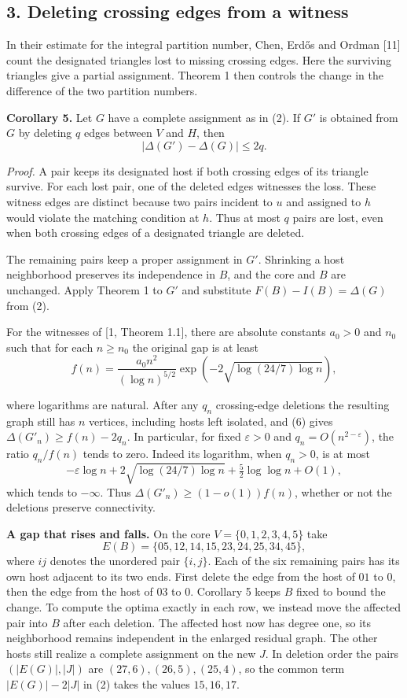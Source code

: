 \documentclass[english,11pt,a4paper]{article}
\begin{document}
\subsection{3. Deleting crossing edges from a witness}\label{deleting-crossing-edges-from-a-witness}

In their estimate for the integral partition number, Chen, Erdős and Ordman {[}11{]} count the designated triangles lost to missing crossing edges. Here the surviving triangles give a partial assignment. Theorem 1 then controls the change in the difference of the two partition numbers.

\textbf{Corollary 5.} Let \(G\) have a complete assignment as in (2). If \(G'\) is obtained from \(G\) by deleting \(q\) edges between \(V\) and \(H\), then
\[
|\Delta(G')-\Delta(G)|\le 2q. \tag{6}
\]

\emph{Proof.} A pair keeps its designated host if both crossing edges of its triangle survive. For each lost pair, one of the deleted edges witnesses the loss. These witness edges are distinct because two pairs incident to \(u\) and assigned to \(h\) would violate the matching condition at \(h\). Thus at most \(q\) pairs are lost, even when both crossing edges of a designated triangle are deleted.

The remaining pairs keep a proper assignment in \(G'\). Shrinking a host neighborhood preserves its independence in \(B\), and the core and \(B\) are unchanged. Apply Theorem 1 to \(G'\) and substitute \(F(B)-I(B)=\Delta(G)\) from (2).

For the witnesses of {[}1, Theorem 1.1{]}, there are absolute constants \(a_0>0\) and \(n_0\) such that for each \(n\ge n_0\) the original gap is at least
\[
f(n)=\frac{a_0 n^2}{(\log n)^{5/2}}
      \exp\!\left(-2\sqrt{\log(24/7)\log n}\right),
\]

where logarithms are natural. After any \(q_n\) crossing-edge deletions the resulting graph still has \(n\) vertices, including hosts left isolated, and (6) gives \(\Delta(G'_n)\ge f(n)-2q_n\). In particular, for fixed \(\varepsilon>0\) and \(q_n=O(n^{2-\varepsilon})\), the ratio \(q_n/f(n)\) tends to zero. Indeed its logarithm, when \(q_n>0\), is at most \[
-\varepsilon\log n+2\sqrt{\log(24/7)\log n}+\tfrac52\log\log n+O(1),
\] which tends to \(-\infty\). Thus \(\Delta(G'_n)\ge(1-o(1))f(n)\), whether or not the deletions preserve connectivity.

\textbf{A gap that rises and falls.} On the core \(V=\{0,1,2,3,4,5\}\) take \[
E(B)=\{05,12,14,15,23,24,25,34,45\},
\] where \(ij\) denotes the unordered pair \(\{i,j\}\). Each of the six remaining pairs has its own host adjacent to its two ends. First delete the edge from the host of \(01\) to \(0\), then the edge from the host of \(03\) to \(0\). Corollary 5 keeps \(B\) fixed to bound the change. To compute the optima exactly in each row, we instead move the affected pair into \(B\) after each deletion. The affected host now has degree one, so its neighborhood remains independent in the enlarged residual graph. The other hosts still realize a complete assignment on the new \(J\). In deletion order the pairs \((|E(G)|,|J|)\) are \((27,6),(26,5),(25,4)\), so the common term \(|E(G)|-2|J|\) in (2) takes the values \(15,16,17\).
\end{document}
